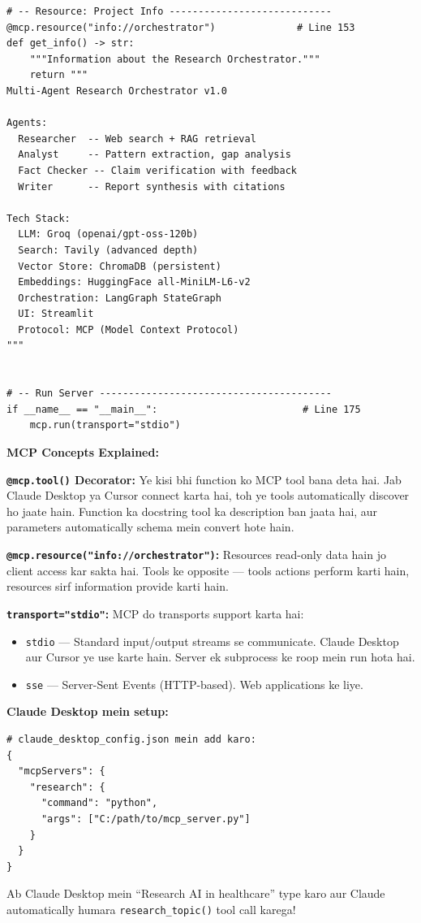 \documentclass[12pt, a4paper]{article}
\begin{document}
\begin{lstlisting}[style=pythonstyle, title={\color{accentgreen}\faIcon{file} mcp\_server.py --- Full Code (208 lines)}]
# -- Resource: Project Info ----------------------------
@mcp.resource("info://orchestrator")              # Line 153
def get_info() -> str:
    """Information about the Research Orchestrator."""
    return """
Multi-Agent Research Orchestrator v1.0

Agents:
  Researcher  -- Web search + RAG retrieval
  Analyst     -- Pattern extraction, gap analysis
  Fact Checker -- Claim verification with feedback
  Writer      -- Report synthesis with citations

Tech Stack:
  LLM: Groq (openai/gpt-oss-120b)
  Search: Tavily (advanced depth)
  Vector Store: ChromaDB (persistent)
  Embeddings: HuggingFace all-MiniLM-L6-v2
  Orchestration: LangGraph StateGraph
  UI: Streamlit
  Protocol: MCP (Model Context Protocol)
"""


# -- Run Server ----------------------------------------
if __name__ == "__main__":                         # Line 175
    mcp.run(transport="stdio")
\end{lstlisting}

\begin{codestorybox}
\textbf{MCP Concepts Explained:}

\textbf{\texttt{@mcp.tool()} Decorator:} Ye kisi bhi function ko MCP tool bana deta hai. Jab Claude Desktop ya Cursor connect karta hai, toh ye tools automatically discover ho jaate hain. Function ka docstring tool ka description ban jaata hai, aur parameters automatically schema mein convert hote hain.

\textbf{\texttt{@mcp.resource("info://orchestrator")}:} Resources read-only data hain jo client access kar sakta hai. Tools ke opposite --- tools actions perform karti hain, resources sirf information provide karti hain.

\textbf{\texttt{transport="stdio"}:} MCP do transports support karta hai:
\begin{itemize}
\item \texttt{stdio} --- Standard input/output streams se communicate. Claude Desktop aur Cursor ye use karte hain. Server ek subprocess ke roop mein run hota hai.
\item \texttt{sse} --- Server-Sent Events (HTTP-based). Web applications ke liye.
\end{itemize}

\textbf{Claude Desktop mein setup:}
\begin{lstlisting}[style=bashstyle]
# claude_desktop_config.json mein add karo:
{
  "mcpServers": {
    "research": {
      "command": "python",
      "args": ["C:/path/to/mcp_server.py"]
    }
  }
}
\end{lstlisting}
Ab Claude Desktop mein ``Research AI in healthcare'' type karo aur Claude automatically humara \texttt{research\_topic()} tool call karega!
\end{codestorybox}
\end{document}
